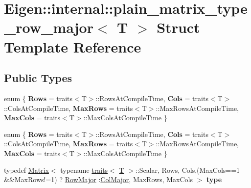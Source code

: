 \hypertarget{struct_eigen_1_1internal_1_1plain__matrix__type__row__major}{}\section{Eigen\+:\+:internal\+:\+:plain\+\_\+matrix\+\_\+type\+\_\+row\+\_\+major$<$ T $>$ Struct Template Reference}
\label{struct_eigen_1_1internal_1_1plain__matrix__type__row__major}
\subsection*{Public Types}
\begin{DoxyCompactItemize}
\item 
\mbox{\label{struct_eigen_1_1internal_1_1plain__matrix__type__row__major_ac015dc5a42511d196228045797e98869}} 
enum \{ {\bfseries Rows} = traits$<$T$>$\+:\+:Rows\+At\+Compile\+Time, 
{\bfseries Cols} = traits$<$T$>$\+:\+:Cols\+At\+Compile\+Time, 
{\bfseries Max\+Rows} = traits$<$T$>$\+:\+:Max\+Rows\+At\+Compile\+Time, 
{\bfseries Max\+Cols} = traits$<$T$>$\+:\+:Max\+Cols\+At\+Compile\+Time
 \}
\item 
\mbox{\label{struct_eigen_1_1internal_1_1plain__matrix__type__row__major_aab90d34cd716fa7e8a29f3cf036f1817}} 
enum \{ {\bfseries Rows} = traits$<$T$>$\+:\+:Rows\+At\+Compile\+Time, 
{\bfseries Cols} = traits$<$T$>$\+:\+:Cols\+At\+Compile\+Time, 
{\bfseries Max\+Rows} = traits$<$T$>$\+:\+:Max\+Rows\+At\+Compile\+Time, 
{\bfseries Max\+Cols} = traits$<$T$>$\+:\+:Max\+Cols\+At\+Compile\+Time
 \}
\item 
\mbox{\label{struct_eigen_1_1internal_1_1plain__matrix__type__row__major_a0b9ddb023beca38784f402c4a5836982}} 
typedef \hyperlink{group___core___module_class_eigen_1_1_matrix}{Matrix}$<$ typename \hyperlink{struct_eigen_1_1internal_1_1traits}{traits}$<$ \hyperlink{group___sparse_core___module}{T} $>$\+::Scalar, Rows, Cols,(Max\+Cols==1 \&\&Max\+Rows!=1) ? \hyperlink{group__enums_ggaacded1a18ae58b0f554751f6cdf9eb13acfcde9cd8677c5f7caf6bd603666aae3}{Row\+Major} \+:\hyperlink{group__enums_ggaacded1a18ae58b0f554751f6cdf9eb13a0cbd4bdd0abcfc0224c5fcb5e4f6669a}{Col\+Major}, Max\+Rows, Max\+Cols $>$ {\bfseries type}

\end{DoxyCompactItemize}
